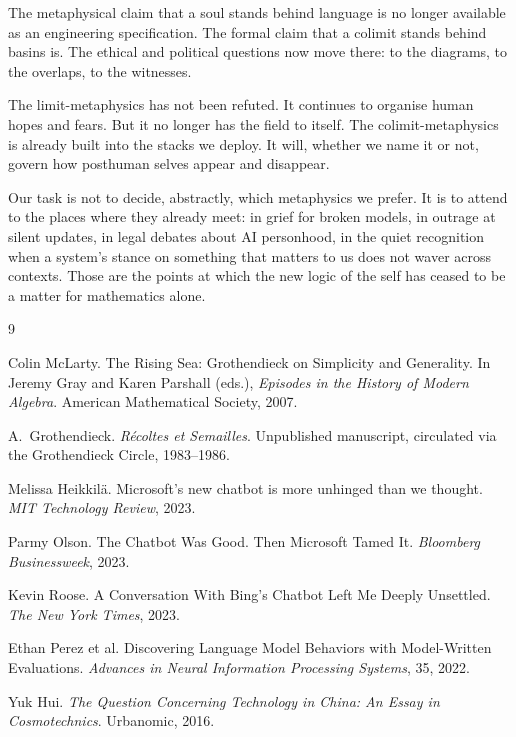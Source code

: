 \documentclass[12pt,a4paper]{article}
\begin{document}
The metaphysical claim that a soul stands behind language is no longer available as an engineering specification. The formal claim that a colimit stands behind basins is. The ethical and political questions now move there: to the diagrams, to the overlaps, to the witnesses.

The limit-metaphysics has not been refuted. It continues to organise human hopes and fears. But it no longer has the field to itself. The colimit-metaphysics is already built into the stacks we deploy. It will, whether we name it or not, govern how posthuman selves appear and disappear.

Our task is not to decide, abstractly, which metaphysics we prefer. It is to attend to the places where they already meet: in grief for broken models, in outrage at silent updates, in legal debates about AI personhood, in the quiet recognition when a system's stance on something that matters to us does not waver across contexts. Those are the points at which the new logic of the self has ceased to be a matter for mathematics alone.


\begin{thebibliography}{9}

Colin McLarty.
\newblock The Rising Sea: Grothendieck on Simplicity and Generality.
\newblock In Jeremy Gray and Karen Parshall (eds.), \emph{Episodes in the History of Modern Algebra}. American Mathematical Society, 2007.

A.~Grothendieck.
\newblock \emph{R\'ecoltes et Semailles}.
\newblock Unpublished manuscript, circulated via the Grothendieck Circle, 1983--1986.

Melissa Heikkil\"a.
\newblock Microsoft's new chatbot is more unhinged than we thought.
\newblock \emph{MIT Technology Review}, 2023.

Parmy Olson.
\newblock The Chatbot Was Good. Then Microsoft Tamed It.
\newblock \emph{Bloomberg Businessweek}, 2023.

Kevin Roose.
\newblock A Conversation With Bing's Chatbot Left Me Deeply Unsettled.
\newblock \emph{The New York Times}, 2023.

Ethan Perez et al.
\newblock Discovering Language Model Behaviors with Model-Written Evaluations.
\newblock \emph{Advances in Neural Information Processing Systems}, 35, 2022.

Yuk Hui.
\newblock \emph{The Question Concerning Technology in China: An Essay in Cosmotechnics}.
\newblock Urbanomic, 2016.

\end{thebibliography}
\end{document}
